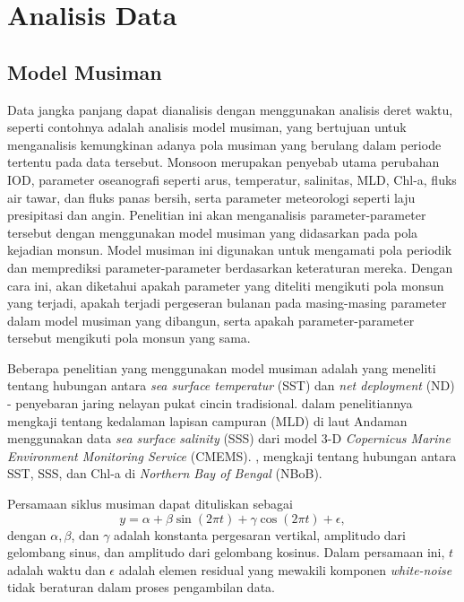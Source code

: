 \section[Analisis Data]{Analisis Data}
\begin{spacing}{1.5}
	\subsection[Model Musiman]{Model Musiman}
	Data jangka panjang dapat dianalisis dengan menggunakan analisis deret waktu, seperti contohnya adalah analisis model musiman, yang bertujuan untuk menganalisis kemungkinan adanya pola musiman yang berulang dalam periode tertentu pada data tersebut. Monsoon merupakan penyebab utama perubahan IOD, parameter oseanografi seperti arus, temperatur, salinitas, MLD, Chl-a, fluks air tawar, dan fluks panas bersih, serta parameter meteorologi seperti laju presipitasi dan angin. Penelitian ini akan menganalisis parameter-parameter tersebut dengan menggunakan model musiman yang didasarkan pada pola kejadian monsun. Model musiman ini digunakan untuk mengamati pola periodik dan memprediksi parameter-parameter berdasarkan keteraturan mereka. Dengan cara ini, akan diketahui apakah parameter yang diteliti mengikuti pola monsun yang terjadi, apakah terjadi pergeseran bulanan pada masing-masing parameter dalam model musiman yang dibangun, serta apakah parameter-parameter tersebut mengikuti pola monsun yang sama.
	
	Beberapa penelitian yang menggunakan model musiman adalah  \citeyear{Haridhi2016} yang meneliti tentang hubungan antara \textit{sea surface temperatur} (SST) dan \textit{net deployment} (ND) - penyebaran jaring nelayan pukat cincin tradisional.  \citeyear{Ikhwan2022} dalam penelitiannya mengkaji tentang kedalaman lapisan campuran (MLD) di laut Andaman menggunakan data \textit{sea surface salinity} (SSS) dari model 3-D \textit{Copernicus Marine Environment Monitoring Service} (CMEMS).  \citeyear{hidayat2023relationship}, mengkaji tentang hubungan antara SST, SSS, dan Chl-a di \textit{Northern Bay of Bengal} (NBoB). 
	
	Persamaan siklus musiman \cite{crawley2012r} dapat dituliskan sebagai
	\begin{equation}\label{eq:sm_}
		y = \alpha + \beta \sin(2\pi t)+\gamma \cos(2\pi t) + \epsilon,
	\end{equation}
	dengan $\alpha, \beta$, dan $\gamma$  adalah konstanta pergesaran vertikal, amplitudo dari gelombang sinus, dan amplitudo dari gelombang kosinus. Dalam persamaan ini, $t$ adalah waktu dan $\epsilon$ adalah elemen residual yang mewakili komponen \textit{white-noise} tidak beraturan dalam proses pengambilan data. 
	

\end{spacing}
